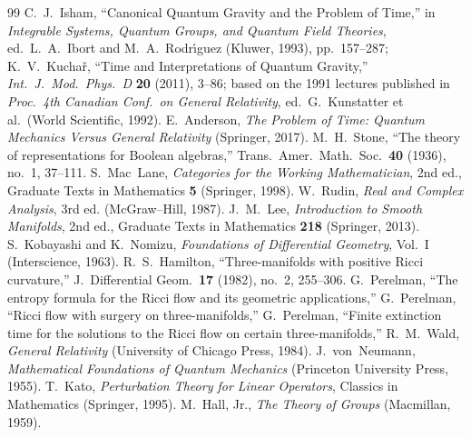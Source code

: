 \documentclass[12pt,openany]{book}
\numberwithin{equation}{section}
\theoremstyle{plain}
\theoremstyle{definition}
\theoremstyle{remark}
\begin{document}
\begin{thebibliography}{99}
	C.~J.~Isham,
	``Canonical Quantum Gravity and the Problem of Time,''
	in \textit{Integrable Systems, Quantum Groups, and Quantum Field Theories},
	ed.\ L.~A.~Ibort and M.~A.~Rodr\'{\i}guez
	(Kluwer, 1993), pp.~157--287;
	K.~V.~Kucha\v{r},
	``Time and Interpretations of Quantum Gravity,''
	\textit{Int.\ J.\ Mod.\ Phys.\ D} \textbf{20} (2011), 3--86;
	based on the 1991 lectures published in
	\textit{Proc.\ 4th Canadian Conf.\ on General Relativity},
	ed.\ G.~Kunstatter et al.\ (World Scientific, 1992).
	E.~Anderson,
	\emph{The Problem of Time: Quantum Mechanics Versus General Relativity}
	(Springer, 2017).
	M.~H.~Stone,
	``The theory of representations for Boolean algebras,''
	Trans.\ Amer.\ Math.\ Soc.\ \textbf{40} (1936), no.~1, 37--111.
	S.~Mac~Lane,
	\emph{Categories for the Working Mathematician}, 2nd ed.,
	Graduate Texts in Mathematics \textbf{5}
	(Springer, 1998).
	W.~Rudin,
	\emph{Real and Complex Analysis}, 3rd ed.
	(McGraw--Hill, 1987).
	J.~M.~Lee,
	\emph{Introduction to Smooth Manifolds}, 2nd ed.,
	Graduate Texts in Mathematics \textbf{218}
	(Springer, 2013).
	S.~Kobayashi and K.~Nomizu,
	\emph{Foundations of Differential Geometry}, Vol.~I
	(Interscience, 1963).
	R.~S.~Hamilton,
	``Three-manifolds with positive Ricci curvature,''
	J.\ Differential Geom.\ \textbf{17} (1982), no.~2, 255--306.
	G.~Perelman,
	``The entropy formula for the Ricci flow and its geometric
	applications,''
	G.~Perelman,
	``Ricci flow with surgery on three-manifolds,''
	G.~Perelman,
	``Finite extinction time for the solutions to the Ricci flow on certain
	three-manifolds,''
	R.~M.~Wald,
	\emph{General Relativity}
	(University of Chicago Press, 1984).
	J.~von~Neumann,
	\emph{Mathematical Foundations of Quantum Mechanics}
	(Princeton University Press, 1955).
	T.~Kato,
	\emph{Perturbation Theory for Linear Operators},
	Classics in Mathematics
	(Springer, 1995).
	M.~Hall, Jr.,
	\emph{The Theory of Groups}
	(Macmillan, 1959).

\end{thebibliography}
\end{document}
